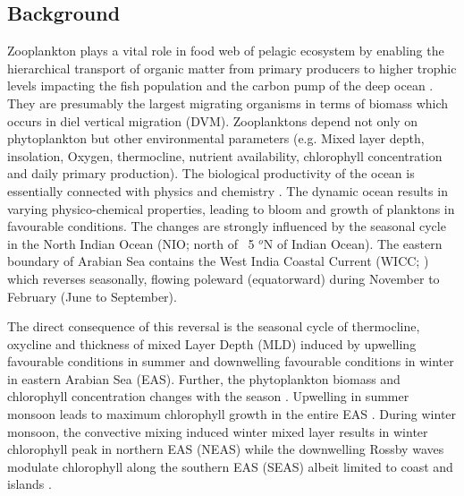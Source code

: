 \documentclass{article}
\begin{document}
	\subsection{Background}
	Zooplankton plays a vital role in food web of pelagic ecosystem by enabling the hierarchical transport of organic matter from primary producers to higher trophic levels impacting the fish population and the carbon pump of the deep ocean \citep{ohman2001density,le2016global}. They are presumably the largest migrating organisms in terms of biomass \citep{hays2003review} which occurs in diel vertical migration (DVM). Zooplanktons depend not only on phytoplankton but other environmental parameters (e.g. Mixed layer depth, insolation, Oxygen, thermocline, nutrient availability, chlorophyll concentration and daily primary production). The biological productivity of the ocean is essentially connected with physics and chemistry \citep{subrahmanyan1959studiespart2, ryther1966primary, qasim1977biological, nair1970primary,banse1995zooplankton,mccreary2009biophysical, vijith2016consequences,amol2020modulation}. The dynamic ocean results in varying physico-chemical properties, leading to bloom and growth of planktons in favourable conditions. The changes are strongly influenced by the seasonal cycle in the North Indian Ocean (NIO; north of ~5 $^o$N of Indian Ocean). The eastern boundary of Arabian Sea contains the West India Coastal Current (WICC; \citep{patil1964hydrography,ramamirtham1965hydrography, banse1968hydrography,shetye1991coastal,mccreary1993numerical, shankar1997dynamics, shetye1998coastal, maheswaran2000upwelling, amol2014observed, chaudhuri2020observed,chaudhuri2021observed}) which reverses seasonally, flowing poleward (equatorward) during November to February (June to September). 
	
	The direct consequence of this reversal is the seasonal cycle of thermocline, oxycline and thickness of mixed Layer Depth (MLD) induced by upwelling favourable conditions in summer and downwelling favourable conditions in winter in eastern Arabian Sea (EAS). Further, the phytoplankton biomass and chlorophyll concentration changes with the season \citep{subrahmanyan1960studies, banse1968hydrography, levy2007basin, vijith2016consequences}. Upwelling in  summer monsoon leads to maximum chlorophyll growth in the entire EAS \citep{ banse1968hydrography, banse2000geographical, mccreary2009biophysical, hood2017biogeochemical,shi2022phytoplankton}. During winter monsoon, the convective mixing induced winter mixed layer \citep{shetye1992does, madhupratap1996mechanism, levy2007basin, vijith2016consequences, shankar2016inhibition, keerthi2017physical,shi2022phytoplankton} results in winter chlorophyll peak in northern EAS (NEAS) while the downwelling Rossby waves modulate chlorophyll along the southern EAS (SEAS) albeit limited to coast and islands \citep{amol2020modulation}. 
	
\end{document}
